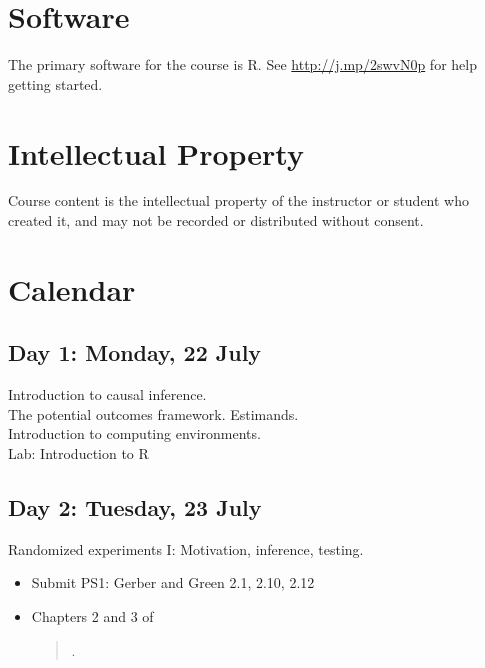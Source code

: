\documentclass[11pt]{article}
\newcommand{\bibverse}[1]{\begin{verse} \bibentry{#1}. \end{verse}}
\begin{document}
\section*{Software}

The primary software for the course is R.  See \href{http://www.ryantmoore.org/files/class/introPolResearch/intro_R_short.pdf}{http://j.mp/2swvN0p}
for help getting started.   

\section*{Intellectual Property}
Course content is the intellectual property of the instructor or student who created it, and may not be recorded or distributed without consent.




\section*{Calendar}
\renewcommand{\labelitemi}{$\square$}

\subsection*{Day 1: Monday, 22 July}
	Introduction to causal inference.\\
	The potential outcomes framework.  Estimands.\\
	Introduction to computing environments. \\
Lab: Introduction to R


\subsection*{Day 2: Tuesday, 23 July}
Randomized experiments I: Motivation, inference, testing.


\begin{itemize}
	\item Submit PS1: Gerber and Green 2.1, 2.10, 2.12
	\item Chapters 2 and 3 of \bibverse{gergre12}
\end{itemize}
\end{document}
